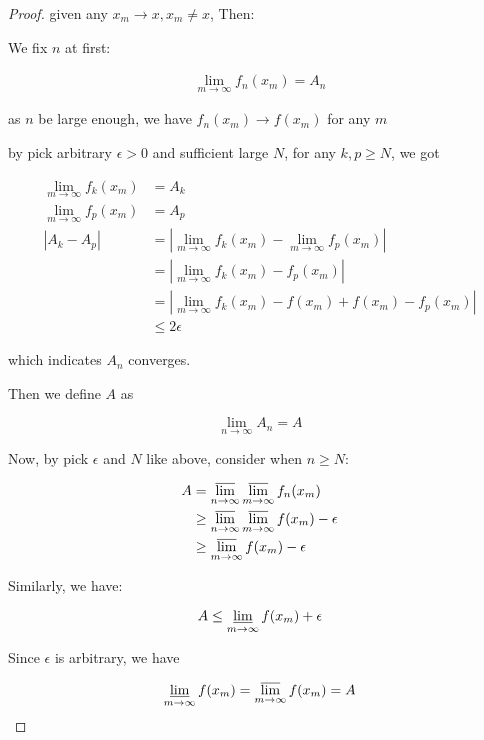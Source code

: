 \begin{proof}
    given any $x_m \to x, x_m \ne x$, Then:

    We fix $n$ at first:

    \begin{align*}
        \lim_{m \to \infty} f_n(x_m) = A_n
    \end{align*}

    as $n$ be large enough, we have $f_n(x_m) \to f(x_m)$ for any $m$
    
    by pick arbitrary $\epsilon > 0$ and sufficient large $N$, for any $k,p \ge N$, we got

    \begin{align*}
        \lim_{m \to \infty}f_k(x_m) &= A_k \\
        \lim_{m \to \infty}f_p(x_m) &= A_p \\
        \left| A_k - A_p \right| &= \left| \lim_{m \to \infty}f_k(x_m) - \lim_{m \to \infty}f_p(x_m) \right| \\
        & = \left| \lim_{m \to \infty}f_k(x_m) -f_p(x_m) \right| \\
        & = \left| \lim_{m \to \infty}f_k(x_m) -f(x_m) + f(x_m) -f_p(x_m) \right| \\
        & \le 2\epsilon 
    \end{align*}

    which indicates $A_n$ converges.

    Then we define $A$ as

    \[
        \lim_{n \to \infty}A_n = A
    \]

    Now, by pick $\epsilon$ and $N$ like above, consider when $n \ge N$:

    \begin{align*}
        A &= \varlimsup_{n \to \infty} \varlimsup_{m \to \infty}f_n(x_m) \\
            & \ge \varlimsup_{n \to \infty} \varlimsup_{m \to \infty}f(x_m) - \epsilon \\
            & \ge \varlimsup_{m \to \infty}f(x_m) - \epsilon
    \end{align*}

    Similarly, we have:

    \[
       A \le \varliminf_{m \to \infty}f(x_m) + \epsilon 
    \]

    Since $\epsilon$ is arbitrary, we have

    \[
\varliminf_{m \to \infty}f(x_m) =  \varlimsup_{m \to \infty}f(x_m) = A
    \]
\end{proof}

